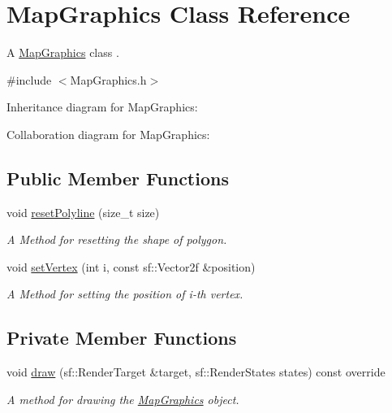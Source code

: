 \hypertarget{classMapGraphics}{}\section{Map\+Graphics Class Reference}
\label{classMapGraphics}


A \hyperlink{classMapGraphics}{Map\+Graphics} class .  




{\ttfamily \#include $<$Map\+Graphics.\+h$>$}



Inheritance diagram for Map\+Graphics\+:


Collaboration diagram for Map\+Graphics\+:
\subsection*{Public Member Functions}
\begin{DoxyCompactItemize}
\item 
void \hyperlink{classMapGraphics_a389137596a79ed6a8239fe5451f8f470}{reset\+Polyline} (size\+\_\+t size)
\begin{DoxyCompactList}\small\item\em A Method for resetting the shape of polygon. \end{DoxyCompactList}\item 
void \hyperlink{classMapGraphics_a0d58d85db2e9d6e62623ebab6ffa11e9}{set\+Vertex} (int i, const sf\+::\+Vector2f \&position)
\begin{DoxyCompactList}\small\item\em A Method for setting the position of i-\/th vertex. \end{DoxyCompactList}\end{DoxyCompactItemize}
\subsection*{Private Member Functions}
\begin{DoxyCompactItemize}
\item 
void \hyperlink{classMapGraphics_a6bd8a1174e0f56edb00def916a096e3c}{draw} (sf\+::\+Render\+Target \&target, sf\+::\+Render\+States states) const override
\begin{DoxyCompactList}\small\item\em A method for drawing the \hyperlink{classMapGraphics}{Map\+Graphics} object. \end{DoxyCompactList}\end{DoxyCompactItemize}
